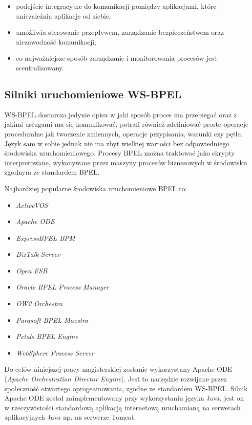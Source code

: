 \begin{itemize}
\item podejście integracyjne do komunikacji pomiędzy aplikacjami, które uniezależnia aplikacje od siebie,  
\item umożliwia sterowanie przepływem, zarządzanie bezpieczeństwem oraz niezawodność komunikacji,
\item co najważniejsze sposób zarządzanie i monitorowania procesów jest scentralizowany. 
\end{itemize}

\subsection{Silniki uruchomieniowe WS-BPEL}
\label{sec:bpelEngines}

WS-BPEL dostarcza jedynie opisu w jaki sposób proces ma przebiegać oraz z jakimi usługami ma się komunikować, potrafi również zdefiniować proste operacje proceduralne jak tworzenie zmiennych, operacje przypisania, warunki czy pętle. Język sam w sobie jednak nie ma zbyt wielkiej wartości bez odpowiedniego środowiska uruchomieniowego. Procesy BPEL można traktować jako skrypty interpretowane, wykonywane przez maszyny procesów biznesowych w środowisku zgodnym ze standardem BPEL. 

Najbardziej popularne środowiska uruchomieniowe BPEL to:

\begin{itemize}
\item \textit{ActiveVOS} 
\item \textit{Apache ODE}
\item \textit{ExpressBPEL BPM}
\item \textit{BizTalk Server}
\item \textit{Open ESB}
\item \textit{Oracle BPEL Process Manager}
\item \textit{OW2 Orchestra}
\item \textit{Parasoft BPEL Maestro}
\item \textit{Petals BPEL Engine}
\item \textit{WebSphere Process Server}
\end{itemize}

Do celów niniejszej pracy magisterskiej zostanie wykorzystany Apache ODE (\textit{Apache Orchestration Director Engine}). Jest to narzędzie rozwijane przez społeczność otwartego oprogeamowania, zgodne ze standardem WS-BPEL. Silnik Apache ODE został zaimplementowany przy wykorzystaniu języka Java, jest on w rzeczywistości standardową aplikacją internetową uruchamianą na serwerach aplikacyjnych Java np. na serwerze Tomcat. 

